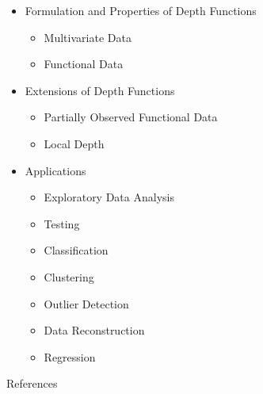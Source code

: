 \documentclass[handout, notes]{beamer}
\begin{document}
    \begin{frame}{}
        \begin{itemize}
            \item Formulation and Properties of Depth Functions
            \begin{itemize}
                \item Multivariate Data
                \item \alert<2>{Functional Data}
            \end{itemize}
            \item Extensions of Depth Functions
            \begin{itemize}
                \item \alert<2>{Partially Observed Functional Data}
                \item \alert<2>{Local Depth}
            \end{itemize}
            \item Applications
            \begin{itemize}
                \item Exploratory Data Analysis
                \item Testing
                \item Classification
                \item Clustering
                \item \alert<2>{Outlier Detection}
                \item \alert<2>{Data Reconstruction}
                \item \alert<2>{Regression}
            \end{itemize}
        \end{itemize}
    \end{frame}



    \begin{frame}[allowframebreaks]{References}
        \nocite{%
            zuo-serfling-2000,
            gijbels-nagy-2017,
            chakraborty-chaudhuri-2014a,
            chakraborty-chaudhuri-2014b,
            fraiman-muniz-2001,
            mosler-2013,
            nagy-gijbels-hlubinka-2017,
            pintado-romo-2009,
            pintado-romo-2011,
            kraus-2015,
            kneip-liebl-2020,
            elias-jimenez-paganoni-sangalli-2023,
            elias-jimenez-shang-2023,
            hubert-rousseeuw-segaert-2015,
            dai-genton-2018,
            gil-romo-2014,
            paindaveine-bever-2013%
        }
        
        
    \end{frame}
\end{document}
